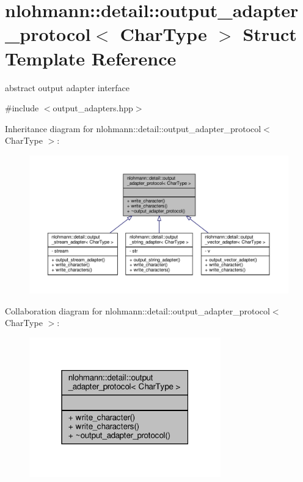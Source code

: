 \hypertarget{structnlohmann_1_1detail_1_1output__adapter__protocol}{}\section{nlohmann\+:\+:detail\+:\+:output\+\_\+adapter\+\_\+protocol$<$ Char\+Type $>$ Struct Template Reference}
\label{structnlohmann_1_1detail_1_1output__adapter__protocol}


abstract output adapter interface  




{\ttfamily \#include $<$output\+\_\+adapters.\+hpp$>$}



Inheritance diagram for nlohmann\+:\+:detail\+:\+:output\+\_\+adapter\+\_\+protocol$<$ Char\+Type $>$\+:
\nopagebreak
\begin{figure}[H]
\begin{center}
\leavevmode
\includegraphics[width=350pt]{structnlohmann_1_1detail_1_1output__adapter__protocol__inherit__graph}
\end{center}
\end{figure}


Collaboration diagram for nlohmann\+:\+:detail\+:\+:output\+\_\+adapter\+\_\+protocol$<$ Char\+Type $>$\+:
\nopagebreak
\begin{figure}[H]
\begin{center}
\leavevmode
\includegraphics[width=235pt]{structnlohmann_1_1detail_1_1output__adapter__protocol__coll__graph}
\end{center}
\end{figure}
